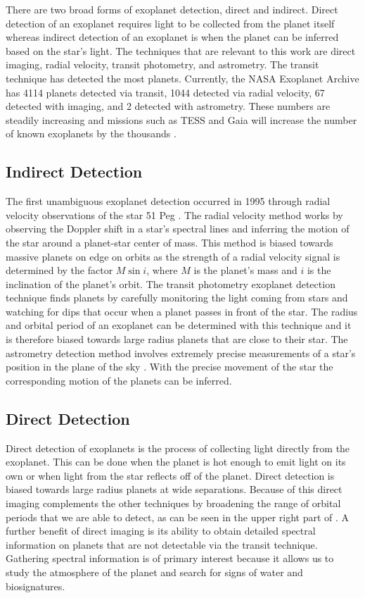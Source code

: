 There are two broad forms of exoplanet detection, direct and indirect. Direct
detection of an exoplanet requires light to be collected from the planet itself
whereas indirect detection of an exoplanet is when the planet can be inferred
based on the star's light. The techniques that are relevant to this work are
direct imaging, radial velocity, transit photometry, and astrometry. The transit technique
has detected the most planets. Currently, the NASA Exoplanet Archive has 4114
planets detected via transit, 1044 detected via radial velocity, 67 detected
with imaging, and 2 detected with astrometry. These numbers are steadily
increasing and missions such as TESS and Gaia will increase the number of known
exoplanets by the thousands \citep{Perryman2018a} \citep{Huang2018}.

\subsection{Indirect Detection} 

The first unambiguous exoplanet detection occurred in 1995 through radial
velocity observations of the star 51 Peg \citep{mayorJupitermassCompanion1995}.
The radial velocity method works by observing the Doppler shift in a star's
spectral lines and inferring the motion of the star around a planet-star center
of mass. This method is biased towards massive planets on edge on orbits as the
strength of a radial velocity signal is determined by the factor $M\sin{i}$,
where $M$ is the planet's mass and $i$ is the inclination of the planet's
orbit. The transit photometry exoplanet detection technique finds planets by
carefully monitoring the light coming from stars and watching for dips that
occur when a planet passes in front of the star. The radius and orbital period
of an exoplanet can be determined with this technique and it is therefore
biased towards large radius planets that are close to their star. The
astrometry detection method involves extremely precise measurements of a
star's position in the plane of the sky \citep{Perryman2018a}. With the
precise movement of the star the corresponding motion of the planets can be
inferred.


\subsection{Direct Detection}

Direct detection of exoplanets is the process of collecting light directly from
the exoplanet. This can be done when the planet is hot enough to emit light on
its own or when light from the star reflects off of the planet. Direct
detection is biased towards large radius planets at wide separations. Because
of this direct imaging complements the other techniques by broadening the range
of orbital periods that we are able to detect, as can be seen in the upper
right part of . A further benefit of
direct imaging is its ability to obtain detailed spectral information on
planets that are not detectable via the transit technique. Gathering spectral
information is of primary interest because it allows us to study the atmosphere
of the planet and search for signs of water and biosignatures.


